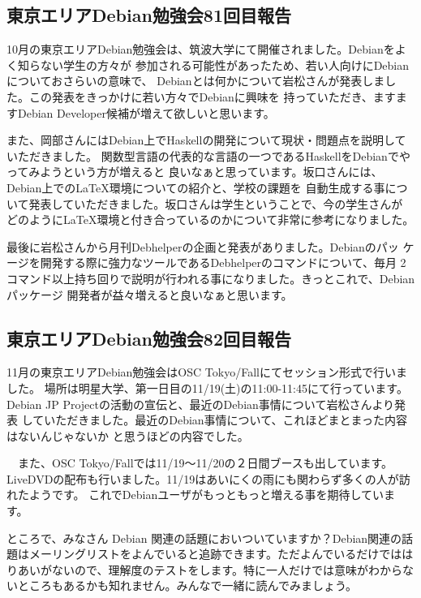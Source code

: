 \documentclass[mingoth,a4paper]{jsarticle}
\begin{document}
\subsection{東京エリアDebian勉強会81回目報告}

10月の東京エリアDebian勉強会は、筑波大学にて開催されました。Debianをよく知らない学生の方々が
参加される可能性があったため、若い人向けにDebianについておさらいの意味で、
Debianとは何かについて岩松さんが発表しました。この発表をきっかけに若い方々でDebianに興味を
持っていただき、ますますDebian Developer候補が増えて欲しいと思います。

また、岡部さんにはDebian上でHaskellの開発について現状・問題点を説明していただきました。
関数型言語の代表的な言語の一つであるHaskellをDebianでやってみようという方が増えると
良いなぁと思っています。坂口さんには、Debian上でのLaTeX環境についての紹介と、学校の課題を
自動生成する事について発表していただきました。坂口さんは学生ということで、今の学生さんが
どのようにLaTeX環境と付き合っているのかについて非常に参考になりました。

最後に岩松さんから月刊Debhelperの企画と発表がありました。Debianのパッ
ケージを開発する際に強力なツールであるDebhelperのコマンドについて、毎月
2コマンド以上持ち回りで説明が行われる事になりました。きっとこれで、Debianパッケージ
開発者が益々増えると良いなぁと思います。

\subsection{東京エリアDebian勉強会82回目報告}

11月の東京エリアDebian勉強会はOSC Tokyo/Fallにてセッション形式で行いました。
場所は明星大学、第一日目の11/19(土)の11:00-11:45にて行っています。
Debian JP Projectの活動の宣伝と、最近のDebian事情について岩松さんより発表
していただきました。最近のDebian事情について、これほどまとまった内容はないんじゃないか
と思うほどの内容でした。

　また、OSC Tokyo/Fallでは11/19〜11/20の２日間ブースも出しています。
LiveDVDの配布も行いました。11/19はあいにくの雨にも関わらず多くの人が訪れたようです。
これでDebianユーザがもっともっと増える事を期待しています。



ところで、みなさん Debian 関連の話題においついていますか？Debian関連の話
題はメーリングリストをよんでいると追跡できます。ただよんでいるだけではは
りあいがないので、理解度のテストをします。特に一人だけでは意味がわからな
いところもあるかも知れません。みんなで一緒に読んでみましょう。
\end{document}
